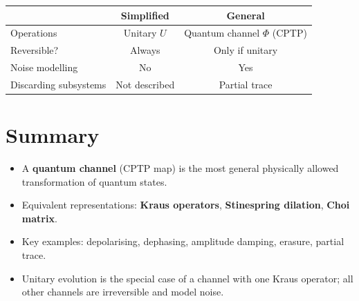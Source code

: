 \documentclass[11pt]{article}
\theoremstyle{definition}
\begin{document}
\begin{center}
\begin{tabular}{lcc}
\hline
& \textbf{Simplified} & \textbf{General} \\\hline
Operations & Unitary $U$ & Quantum channel $\Phi$ (CPTP) \\
Reversible? & Always & Only if unitary \\
Noise modelling & No & Yes \\
Discarding subsystems & Not described & Partial trace \\
\hline
\end{tabular}
\end{center}

\section{Summary}

\begin{itemize}
    \item A \textbf{quantum channel} (CPTP map) is the most general physically allowed transformation of quantum states.
    \item Equivalent representations: \textbf{Kraus operators}, \textbf{Stinespring dilation}, \textbf{Choi matrix}.
    \item Key examples: depolarising, dephasing, amplitude damping, erasure, partial trace.
    \item Unitary evolution is the special case of a channel with one Kraus operator; all other channels are irreversible and model noise.
\end{itemize}
\end{document}
